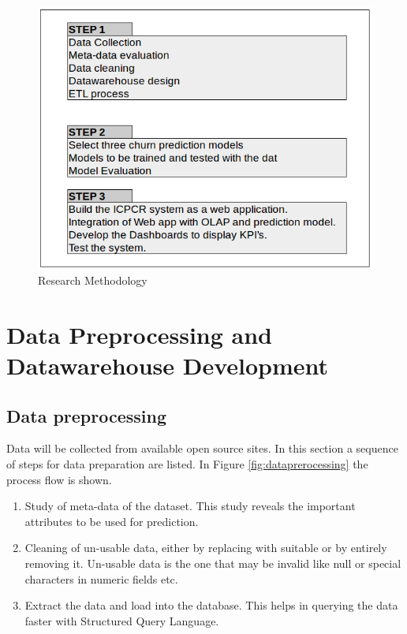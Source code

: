 \begin{figure}[h!]
	\includegraphics[scale = 0.5]{figures/ICPCR.png}
	\centering
	\caption{Research Methodology}
	\label{fig:ResearchMethodology}
\end{figure}
\newpage

\section{Data Preprocessing and Datawarehouse Development}

\subsection{Data preprocessing}

Data will be collected from available open source sites.
In this section a sequence of steps for data preparation are listed. In Figure \ref{fig:dataprerocessing} the process flow is shown.

\begin{enumerate}
	\item Study of meta-data of the dataset. This study reveals the important attributes to be used for prediction.
	\item Cleaning of un-usable data, either by replacing with suitable or by entirely removing it. Un-usable data is the one that may be invalid like null or special characters in numeric fields etc.
	\item Extract the data and load into the database. This helps in querying the data faster with Structured Query Language.
\end{enumerate}

